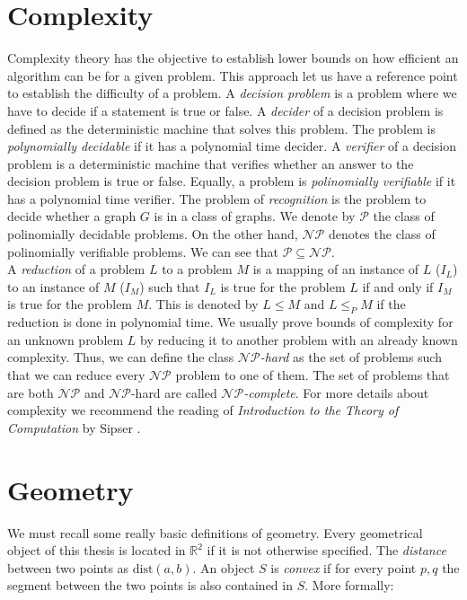 \section{Complexity}

Complexity theory has the objective to establish lower bounds on how efficient an algorithm can be for a given problem. This approach let us have a reference point to establish the difficulty of a problem. A \emph{decision problem} is a problem where we have to decide if a statement is true or false. A \emph{decider} of a decision problem is defined as the deterministic machine that solves this problem. The problem is \emph{polynomially decidable} if it has a polynomial time decider. A \emph{verifier} of a decision problem is a deterministic machine that verifies whether an answer to the decision problem is true or false. Equally, a problem is \emph{polinomially verifiable} if it has a polynomial time verifier. The problem of \emph{recognition} is the problem to decide whether a graph $G$ is in a class of graphs. We denote by $\mathcal{P}$ the class of polinomially decidable problems. On the other hand, $\mathcal{NP}$ denotes the class of polinomially verifiable problems. We can see that $\mathcal{P} \subseteq \mathcal{NP}$.\\

A \emph{reduction} of a problem $L$ to a problem $M$ is a mapping of an instance of $L$ ($I_L$) to an instance of $M$ ($I_M$) such that $I_L$ is true for the problem $L$ if and
only if $I_M$ is true for the problem $M$. This is denoted by $L \leq M$ and $L \leq_P M$ if the reduction is done in polynomial time. We usually prove bounds of complexity for an unknown problem $L$ by reducing it to another problem with an already known complexity. Thus, we can define the class \emph{$\mathcal{NP}$-hard} as the set of problems such that we can reduce every $\mathcal{NP}$ problem to one of them. The set of problems that are both $\mathcal{NP}$ and $\mathcal{NP}$-hard are called \emph{$\mathcal{NP}$-complete}. For more details about complexity we recommend the reading of \textit{Introduction to the Theory of Computation} by Sipser \cite{sipserIntroductionTheoryComputation2006}.

\section{Geometry}

We must recall some really basic definitions of geometry. Every geometrical object of this thesis is located in $\mathbb{R}^2$ if it is not otherwise specified. The \emph{distance} between two points as $\text{dist}(a,b)$. An object $S$ is \emph{convex} if for every point $p,q$ the segment between the two points is also contained in $S$. More formally:

